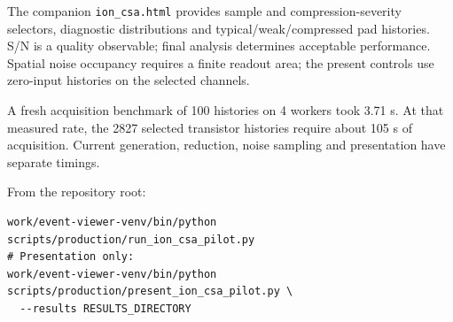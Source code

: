 \documentclass[10pt,a4paper]{article}
\begin{document}
The companion \texttt{ion\_csa.html} provides sample and compression-severity
selectors, diagnostic distributions and typical/weak/compressed pad histories.
S/N is a quality observable; final analysis determines acceptable performance.
Spatial noise occupancy requires a finite readout area; the present controls
use zero-input histories on the selected channels.

A fresh acquisition benchmark of 100 histories on 4 workers took 3.71 s. At that measured rate, the 2827 selected transistor histories require about 105 s of acquisition. Current generation, reduction, noise sampling and presentation have separate timings.

From the repository root:
\begin{verbatim}
work/event-viewer-venv/bin/python scripts/production/run_ion_csa_pilot.py
# Presentation only:
work/event-viewer-venv/bin/python scripts/production/present_ion_csa_pilot.py \
  --results RESULTS_DIRECTORY
\end{verbatim}
\end{document}
